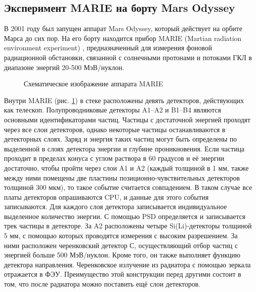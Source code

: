\documentclass[12pt,a4paper]{report} %
\begin{document}
\subsection{Эксперимент MARIE на борту Mars Odyssey}
В 2001 году был запущен аппарат Mars Odyssey, который действует на орбите Марса до сих пор. На его борту находится прибор MARIE (Martian radiation environment experiment) \cite{MARIE}, предназначенный для измерения фоновой радиационной обстановки, связанной с солнечными протонами и потоками ГКЛ в диапазоне энергий 20-500 МэВ/нуклон. 
\begin{figure}
	\noindent{}
	\caption{Схематическое изображение аппарата MARIE}
	\label{figMARIE}
\end{figure}
Внутри MARIE (рис. \ref{figMARIE}) в стеке расположены девять детекторов, действующих как телескоп. Полупроводниковые детекторы A1--A2 и B1--B4 являются основными идентификаторами частиц. Частицы с достаточной энергией проходят через все слои детекторов, однако некоторые частицы останавливаются в детекторных слоях.  Заряд и энергия таких частиц могут быть определены по выделенной в слоях детектора энергии и глубине проникновения. Если частица проходит в пределах конуса с углом раствора в 60 градусов и её энергии достаточно, чтобы пройти через слои A1 и A2 (каждый толщиной в 1 мм, также между ними помещены две пластины позиционно-чувствительных детекторов толщиной 300 мкм), то такое событие считается совпадением. В таком случае все платы детекторов опрашиваются CPU, и данные для этого события записываются. Для каждого слоя детектора записывается индивидуальное выделенное количество энергии. С помощью PSD определяется и записывается трек частицы в детекторе. За A2 расположены четыре Si(Li)-детекторы толщиной 5 мм, с помощью которых проводятся измерения с высоким разрешением. За ними расположен черенковский детектор С, осуществляющий отбор частиц с энергией больше 500 МэВ/нуклон. Кроме того, он также выполняет функцию детектора направления. 
Черенковское излучение из радиатора с помощью зеркала отражается в ФЭУ. Преимущество этой конструкции перед другими состоит в том, что  после радиатора можно поставить ещё слои детекторов.
\end{document}

